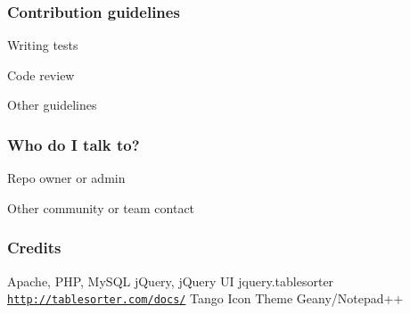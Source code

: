 \subsubsection*{Contribution guidelines}


\begin{DoxyItemize}
\item Writing tests
\item Code review
\item Other guidelines
\end{DoxyItemize}

\subsubsection*{Who do I talk to?}


\begin{DoxyItemize}
\item Repo owner or admin
\item Other community or team contact
\end{DoxyItemize}

\subsubsection*{Credits}

Apache, P\+H\+P, My\+S\+Q\+L j\+Query, j\+Query U\+I jquery.\+tablesorter \href{http://tablesorter.com/docs/}{\tt http\+://tablesorter.\+com/docs/} Tango Icon Theme Geany/\+Notepad++ 